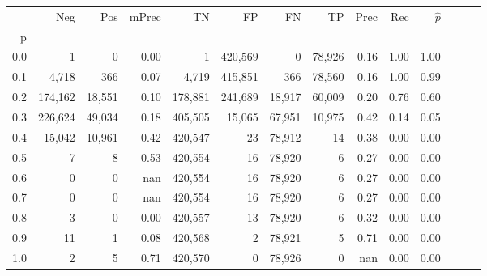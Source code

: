 \begin{tabular}{rrrrrrrrrrrrrr}
\toprule
{} &      Neg &     Pos & mPrec &       TN &       FP &      FN &      TP &  Prec &   Rec & $\hat{p}$ \\
p   &          &         &       &          &          &         &         &       &       &           \\
\midrule
0.0 &        1 &       0 &  0.00 &        1 &  420,569 &       0 &  78,926 &  0.16 &  1.00 &      1.00 \\
0.1 &    4,718 &     366 &  0.07 &    4,719 &  415,851 &     366 &  78,560 &  0.16 &  1.00 &      0.99 \\
0.2 &  174,162 &  18,551 &  0.10 &  178,881 &  241,689 &  18,917 &  60,009 &  0.20 &  0.76 &      0.60 \\
0.3 &  226,624 &  49,034 &  0.18 &  405,505 &   15,065 &  67,951 &  10,975 &  0.42 &  0.14 &      0.05 \\
0.4 &   15,042 &  10,961 &  0.42 &  420,547 &       23 &  78,912 &      14 &  0.38 &  0.00 &      0.00 \\
0.5 &        7 &       8 &  0.53 &  420,554 &       16 &  78,920 &       6 &  0.27 &  0.00 &      0.00 \\
0.6 &        0 &       0 &   nan &  420,554 &       16 &  78,920 &       6 &  0.27 &  0.00 &      0.00 \\
0.7 &        0 &       0 &   nan &  420,554 &       16 &  78,920 &       6 &  0.27 &  0.00 &      0.00 \\
0.8 &        3 &       0 &  0.00 &  420,557 &       13 &  78,920 &       6 &  0.32 &  0.00 &      0.00 \\
0.9 &       11 &       1 &  0.08 &  420,568 &        2 &  78,921 &       5 &  0.71 &  0.00 &      0.00 \\
1.0 &        2 &       5 &  0.71 &  420,570 &        0 &  78,926 &       0 &   nan &  0.00 &      0.00 \\
\bottomrule
\end{tabular}
